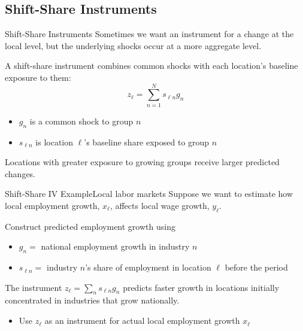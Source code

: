 \documentclass[aspectratio=169,t,11pt,table]{beamer}
\begin{document}
\subsection{Shift-Share Instruments}

\begin{frame}{Shift-Share Instruments}
  Sometimes we want an instrument for a change at the local level, but the underlying shocks occur at a more aggregate level.

  \pause
  \bigskip
  A shift-share instrument combines common shocks with each location's baseline exposure to them:
  $$
    z_\ell = \sum_{n = 1}^{N} s_{\ell n} g_n
  $$

  \begin{itemize}
    \item $g_n$ is a common shock to group $n$
    \item $s_{\ell n}$ is location $\ell$'s baseline share exposed to group $n$
  \end{itemize}

  \bigskip
  Locations with greater exposure to growing groups receive larger predicted changes.
\end{frame}

\begin{frame}{Shift-Share IV Example}{Local labor markets}
  Suppose we want to estimate how local employment growth, $x_\ell$, affects local wage growth, $y_\ell$.

  \bigskip
  Construct predicted employment growth using
  \begin{itemize}
    \item $g_n =$ national employment growth in industry $n$
    \item $s_{\ell n} =$ industry $n$'s share of employment in location $\ell$ before the period
  \end{itemize}

  \pause
  \bigskip
  The instrument $z_\ell = \sum_n s_{\ell n} g_n$ predicts faster growth in locations initially concentrated in industries that grow nationally.
  \begin{itemize}
    \item Use $z_\ell$ as an instrument for actual local employment growth $x_\ell$
  \end{itemize}

\end{frame}
\end{document}
